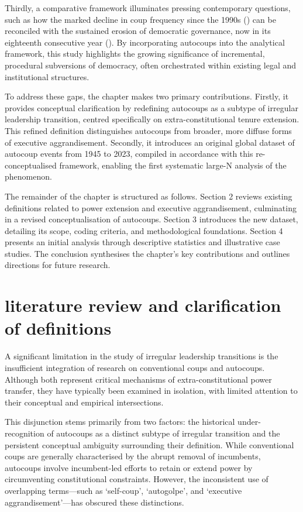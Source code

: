 \documentclass[
  12pt,
]{report}
\begin{document}
Thirdly, a comparative framework illuminates pressing contemporary
questions, such as how the marked decline in coup frequency since the
1990s () can be reconciled with
the sustained erosion of democratic governance, now in its eighteenth
consecutive year (). By incorporating autocoups into the analytical framework, this
study highlights the growing significance of incremental, procedural
subversions of democracy, often orchestrated within existing legal and
institutional structures.

To address these gaps, the chapter makes two primary contributions.
Firstly, it provides conceptual clarification by redefining autocoups as
a subtype of irregular leadership transition, centred specifically on
extra-constitutional tenure extension. This refined definition
distinguishes autocoups from broader, more diffuse forms of executive
aggrandisement. Secondly, it introduces an original global dataset of
autocoup events from 1945 to 2023, compiled in accordance with this
re-conceptualised framework, enabling the first systematic large-N
analysis of the phenomenon.

The remainder of the chapter is structured as follows. Section 2 reviews
existing definitions related to power extension and executive
aggrandisement, culminating in a revised conceptualisation of autocoups.
Section 3 introduces the new dataset, detailing its scope, coding
criteria, and methodological foundations. Section 4 presents an initial
analysis through descriptive statistics and illustrative case studies.
The conclusion synthesises the chapter's key contributions and outlines
directions for future research.

\section{literature review and clarification of
definitions}\label{literature-review-and-clarification-of-definitions}

A significant limitation in the study of irregular leadership
transitions is the insufficient integration of research on conventional
coups and autocoups. Although both represent critical mechanisms of
extra-constitutional power transfer, they have typically been examined
in isolation, with limited attention to their conceptual and empirical
intersections.

This disjunction stems primarily from two factors: the historical
under-recognition of autocoups as a distinct subtype of irregular
transition and the persistent conceptual ambiguity surrounding their
definition. While conventional coups are generally characterised by the
abrupt removal of incumbents, autocoups involve incumbent-led efforts to
retain or extend power by circumventing constitutional constraints.
However, the inconsistent use of overlapping terms---such as
`self-coup', `autogolpe', and `executive aggrandisement'---has obscured
these distinctions.
\end{document}
